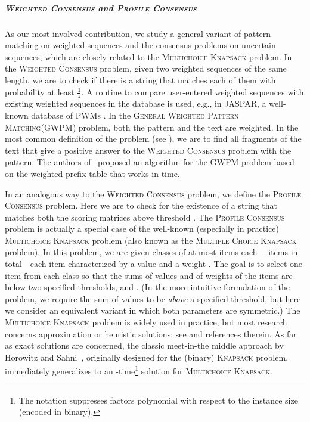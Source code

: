 \documentclass{article}
\theoremstyle{plain}
\theoremstyle{definition}
\newcommand{\MK}{\textsc{Multichoice Knapsack}\xspace}
\newcommand{\GWPM}{\textsc{GWPM}\xspace}
\newcommand{\GWPMFull}{\textsc{General Weighted Pattern Matching}\xspace}
\newcommand{\WC}{\textsc{Weighted Consensus}\xspace}
\newcommand{\PC}{\textsc{Profile Consensus}\xspace}
\newcommand{\Knapsack}{\textsc{Knapsack}\xspace}
\newcommand{\fr}{\ensuremath{\frac1z}}
\begin{document}
  \subparagraph*{\WC and \PC}
  As our most involved contribution, we study a general variant of pattern matching on weighted sequences
  and the consensus problems on uncertain sequences, which are closely related to the \MK problem.
  In the \WC problem, given two weighted sequences of the same length, we are to check if there is
  a string that matches each of them with probability at least \fr.
  A routine to compare user-entered weighted sequences with existing weighted sequences in the database is used,
  e.g., in JASPAR, a well-known database of PWMs \cite{JASPAR}.
  In the \GWPMFull (\GWPM) problem, both the pattern and the text are weighted.
  In the most common definition of the problem (see \cite{DBLP:conf/cwords/BartonP15,costas_weighted_suffix_tree_j}),
  we are to find all fragments of the text that give a positive answer to the \WC problem with the pattern.
  The authors of~\cite{DBLP:conf/cwords/BartonP15} proposed an algorithm for the \GWPM problem based on the weighted prefix table
  that works in  time.

  In an analogous way to the \WC problem, we define the \PC problem.
  Here we are to check for the existence of a string that matches both the scoring matrices above threshold .
  The \PC problem is actually a special case of the well-known (especially in practice) \MK problem
  (also known as the \textsc{Multiple Choice Knapsack} problem).
  In this problem, we are given  classes  of at most  items each--- items in total---each item  characterized by a value  and a weight .
  The goal is to select one item from each class so that the sums of values and of weights of the items are
  below two specified thresholds,  and .
  (In the more intuitive formulation of the problem, we require the sum of values to be \emph{above} a specified threshold,
  but here we consider an equivalent variant in which both parameters are symmetric.)
  The \MK problem is widely used in practice, but most research concerns approximation or heuristic solutions;
  see \cite{DBLP:books/daglib/0010031} and references therein.
  As far as exact solutions are concerned, the classic meet-in-the middle approach by Horowitz and Sahni~\cite{DBLP:journals/jacm/HorowitzS74},
  originally designed for the (binary) \Knapsack problem, immediately generalizes to 
  an -time\footnote{The  notation suppresses factors polynomial with respect to the instance size (encoded in binary). } solution for \MK. 
  
\end{document}
